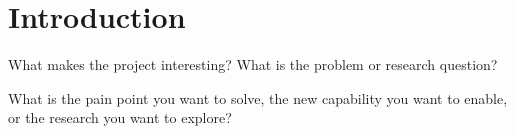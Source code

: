 \section{Introduction}

What makes the project interesting? What is the problem or research question?

What is the pain point you want to solve, the new capability you want to enable, or the research you want to explore?